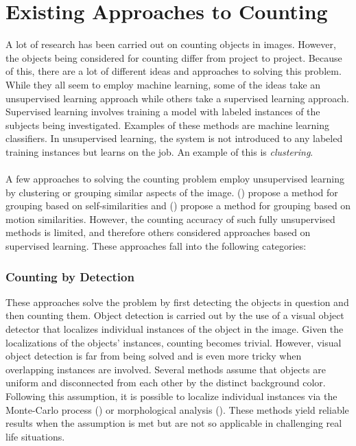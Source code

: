 
\bigskip

\goodbreak

\section{Existing Approaches to Counting}
A lot of research has been carried out on counting objects in images. However, the objects being considered for counting differ from project to project. Because of this, there are a lot of different ideas and approaches to solving this problem. While they all seem to employ machine learning, some of the ideas take an unsupervised learning approach while others take a supervised learning approach. Supervised learning involves training a model with labeled instances of the subjects being investigated. Examples of these methods are machine learning classifiers. In unsupervised learning, the system is not introduced to any labeled training instances but learns on the job. An example of this is \textit{clustering}.\\ \\
%
A few approaches to solving the counting problem employ unsupervised learning by clustering or grouping similar aspects of the image. (\cite{REF14}) propose a method for grouping based on self-similarities and (\cite{REF15}) propose a method for grouping based on motion similarities. However, the counting accuracy of such fully unsupervised methods is limited, and therefore others considered approaches based on supervised learning. These approaches fall into the following categories:

\subsubsection{Counting by Detection}
These approaches solve the problem by first detecting the objects in question and then counting them. Object detection is carried out by the use of a visual object detector that localizes individual instances of the object in the image. Given the localizations of the objects' instances, counting becomes trivial. However, visual object detection is far from being solved and is even more tricky when overlapping instances are involved. Several methods assume that objects are uniform and disconnected from each other by the distinct background color. Following this assumption, it is possible to localize individual instances via the Monte-Carlo process (\cite{REF16}) or morphological analysis (\cite{REF17}). These methods yield reliable results when the assumption is met but are not so applicable in challenging real life situations. 

